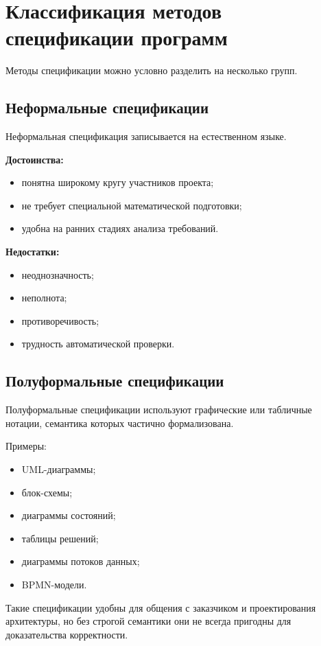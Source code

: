 \documentclass[12pt,a4paper]{article}
\begin{document}
\section{Классификация методов спецификации программ}

Методы спецификации можно условно разделить на несколько групп.

\subsection{Неформальные спецификации}

Неформальная спецификация записывается на естественном языке.

\textbf{Достоинства:}
\begin{itemize}
    \item понятна широкому кругу участников проекта;
    \item не требует специальной математической подготовки;
    \item удобна на ранних стадиях анализа требований.
\end{itemize}

\textbf{Недостатки:}
\begin{itemize}
    \item неоднозначность;
    \item неполнота;
    \item противоречивость;
    \item трудность автоматической проверки.
\end{itemize}

\subsection{Полуформальные спецификации}

Полуформальные спецификации используют графические или табличные нотации, семантика которых частично формализована.

Примеры:
\begin{itemize}
    \item UML-диаграммы;
    \item блок-схемы;
    \item диаграммы состояний;
    \item таблицы решений;
    \item диаграммы потоков данных;
    \item BPMN-модели.
\end{itemize}

Такие спецификации удобны для общения с заказчиком и проектирования архитектуры, но без строгой семантики они не всегда пригодны для доказательства корректности.
\end{document}

